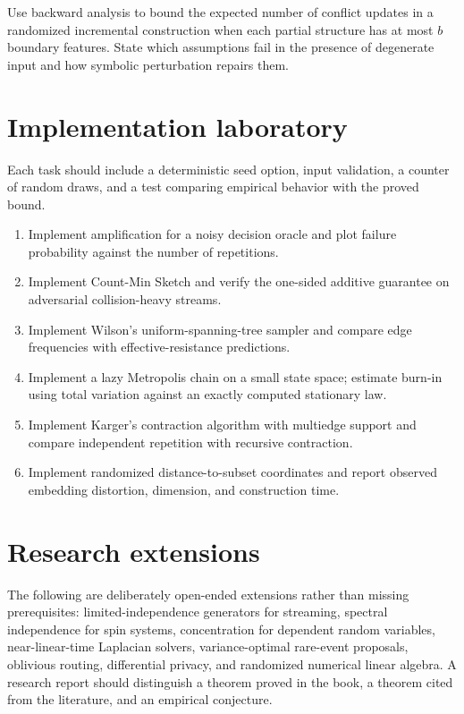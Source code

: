 \begin{problem}[Geometry]
Use backward analysis to bound the expected number of conflict updates in a
randomized incremental construction when each partial structure has at most
$b$ boundary features.  State which assumptions fail in the presence of
degenerate input and how symbolic perturbation repairs them.
\end{problem}

\section{Implementation laboratory}

Each task should include a deterministic seed option, input validation, a
counter of random draws, and a test comparing empirical behavior with the
proved bound.

\begin{enumerate}
\item Implement amplification for a noisy decision oracle and plot failure
      probability against the number of repetitions.
\item Implement Count-Min Sketch and verify the one-sided additive guarantee
      on adversarial collision-heavy streams.
\item Implement Wilson's uniform-spanning-tree sampler and compare edge
      frequencies with effective-resistance predictions.
\item Implement a lazy Metropolis chain on a small state space; estimate
      burn-in using total variation against an exactly computed stationary law.
\item Implement Karger's contraction algorithm with multiedge support and
      compare independent repetition with recursive contraction.
\item Implement randomized distance-to-subset coordinates and report observed
      embedding distortion, dimension, and construction time.
\end{enumerate}

\section{Research extensions}

The following are deliberately open-ended extensions rather than missing
prerequisites: limited-independence generators for streaming, spectral
independence for spin systems, concentration for dependent random variables,
near-linear-time Laplacian solvers, variance-optimal rare-event proposals,
oblivious routing, differential privacy, and randomized numerical linear
algebra.  A research report should distinguish a theorem proved in the book,
a theorem cited from the literature, and an empirical conjecture.

